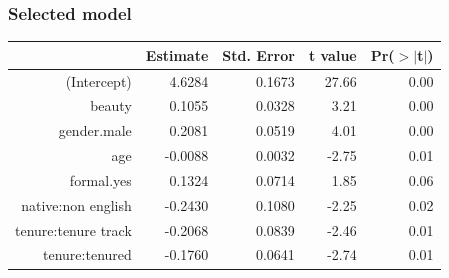 \begin{frame}[fragile]
\frametitle{Selected model}

\begin{center}
\begin{tabular}{rrrrr}
  \hline
 & Estimate & Std. Error & t value & Pr($>$$|$t$|$) \\ 
  \hline
(Intercept) & 4.6284 & 0.1673 & 27.66 & 0.00 \\ 
  beauty & 0.1055 & 0.0328 & 3.21 & 0.00 \\ 
  gender.male & 0.2081 & 0.0519 & 4.01 & 0.00 \\ 
  age & -0.0088 & 0.0032 & -2.75 & 0.01 \\ 
  formal.yes & 0.1324 & 0.0714 & 1.85 & 0.06 \\ 
  native:non english & -0.2430 & 0.1080 & -2.25 & 0.02 \\ 
  tenure:tenure track & -0.2068 & 0.0839 & -2.46 & 0.01 \\ 
  tenure:tenured & -0.1760 & 0.0641 & -2.74 & 0.01 \\ 
   \hline
\end{tabular}
\end{center}

\end{frame}
